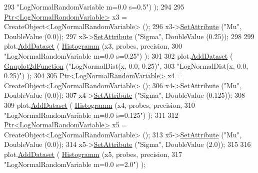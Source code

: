 \begin{DoxyCode}
293                                   \textcolor{stringliteral}{"LogNormalRandomVariable m=0.0 s=0.5"}) );
294 
295     \hyperlink{classns3_1_1Ptr}{Ptr<LogNormalRandomVariable>} x3 = CreateObject<LogNormalRandomVariable> ();
296     x3->\hyperlink{classns3_1_1ObjectBase_ac60245d3ea4123bbc9b1d391f1f6592f}{SetAttribute} (\textcolor{stringliteral}{"Mu"}, DoubleValue (0.0));
297     x3->\hyperlink{classns3_1_1ObjectBase_ac60245d3ea4123bbc9b1d391f1f6592f}{SetAttribute} (\textcolor{stringliteral}{"Sigma"}, DoubleValue (0.25));
298 
299     plot.\hyperlink{classns3_1_1Gnuplot_a306ec724a327cf9ab699700f31fca0a1}{AddDataset} ( \hyperlink{main-random-variable-stream_8cc_a2cfd3837ab3f2e816cf53486d7a186b5}{Histogramm} (x3, probes, precision,
300                                   \textcolor{stringliteral}{"LogNormalRandomVariable m=0.0 s=0.25"}) );
301 
302     plot.\hyperlink{classns3_1_1Gnuplot_a306ec724a327cf9ab699700f31fca0a1}{AddDataset} ( \hyperlink{classns3_1_1Gnuplot2dFunction}{Gnuplot2dFunction} (\textcolor{stringliteral}{"LogNormalDist(x, 0.0, 0.25)"},
303                                          \textcolor{stringliteral}{"LogNormalDist(x, 0.0, 0.25)"}) );
304 
305     \hyperlink{classns3_1_1Ptr}{Ptr<LogNormalRandomVariable>} x4 = CreateObject<LogNormalRandomVariable> ();
306     x4->\hyperlink{classns3_1_1ObjectBase_ac60245d3ea4123bbc9b1d391f1f6592f}{SetAttribute} (\textcolor{stringliteral}{"Mu"}, DoubleValue (0.0));
307     x4->\hyperlink{classns3_1_1ObjectBase_ac60245d3ea4123bbc9b1d391f1f6592f}{SetAttribute} (\textcolor{stringliteral}{"Sigma"}, DoubleValue (0.125));
308 
309     plot.\hyperlink{classns3_1_1Gnuplot_a306ec724a327cf9ab699700f31fca0a1}{AddDataset} ( \hyperlink{main-random-variable-stream_8cc_a2cfd3837ab3f2e816cf53486d7a186b5}{Histogramm} (x4, probes, precision,
310                                   \textcolor{stringliteral}{"LogNormalRandomVariable m=0.0 s=0.125"}) );
311 
312     \hyperlink{classns3_1_1Ptr}{Ptr<LogNormalRandomVariable>} x5 = CreateObject<LogNormalRandomVariable> ();
313     x5->\hyperlink{classns3_1_1ObjectBase_ac60245d3ea4123bbc9b1d391f1f6592f}{SetAttribute} (\textcolor{stringliteral}{"Mu"}, DoubleValue (0.0));
314     x5->\hyperlink{classns3_1_1ObjectBase_ac60245d3ea4123bbc9b1d391f1f6592f}{SetAttribute} (\textcolor{stringliteral}{"Sigma"}, DoubleValue (2.0));
315 
316     plot.\hyperlink{classns3_1_1Gnuplot_a306ec724a327cf9ab699700f31fca0a1}{AddDataset} ( \hyperlink{main-random-variable-stream_8cc_a2cfd3837ab3f2e816cf53486d7a186b5}{Histogramm} (x5, probes, precision,
317                                   \textcolor{stringliteral}{"LogNormalRandomVariable m=0.0 s=2.0"}) );

\end{DoxyCode}
